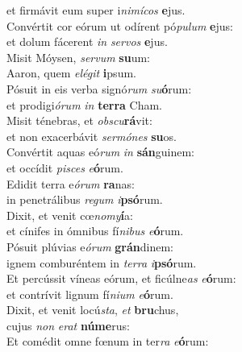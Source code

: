 \oddverse et firmávit eum super i\textit{ni}\textit{mí}\textit{cos} \textbf{e}jus.\\
\evenverse Convértit cor eórum ut odírent pó\textit{pu}\textit{lum} \textbf{e}jus:~\*\\
\evenverse et dolum fácerent \textit{in} \textit{ser}\textit{vos} \textbf{e}jus.\\
\oddverse Misit Móysen, \textit{ser}\textit{vum} \textbf{su}um:~\*\\
\oddverse Aaron, quem \textit{e}\textit{lé}\textit{git} \textbf{i}psum.\\
\evenverse Pósuit in eis verba signó\textit{rum} \textit{su}\textbf{ó}rum:~\*\\
\evenverse et prodigi\textit{ó}\textit{rum} \textit{in} \textbf{ter}\textbf{ra} Cham.\\
\oddverse Misit ténebras, et \textit{ob}\textit{scu}\textbf{rá}vit:~\*\\
\oddverse et non exacerbávit \textit{ser}\textit{mó}\textit{nes} \textbf{su}os.\\
\evenverse Convértit aquas eó\textit{rum} \textit{in} \textbf{sán}guinem:~\*\\
\evenverse et occídit \textit{pi}\textit{sces} \textit{e}\textbf{ó}rum.\\
\oddverse Edidit terra e\textit{ó}\textit{rum} \textbf{ra}nas:~\*\\
\oddverse in penetrálibus \textit{re}\textit{gum} \textit{i}\textbf{psó}rum.\\
\evenverse Dixit, et venit cœ\textit{no}\textit{my}\textbf{í}a:~\*\\
\evenverse et cínifes in ómnibus fí\textit{ni}\textit{bus} \textit{e}\textbf{ó}rum.\\
\oddverse Pósuit plúvias e\textit{ó}\textit{rum} \textbf{grán}dinem:~\*\\
\oddverse ignem comburéntem in \textit{ter}\textit{ra} \textit{i}\textbf{psó}rum.\\
\evenverse Et percússit víneas eórum, et ficúlne\textit{as} \textit{e}\textbf{ó}rum:~\*\\
\evenverse et contrívit lignum fí\textit{ni}\textit{um} \textit{e}\textbf{ó}rum.\\
\oddverse Dixit, et venit locú\textit{sta}, \textit{et} \textbf{bru}chus,~\*\\
\oddverse cujus \textit{non} \textit{e}\textit{rat} \textbf{nú}\textbf{me}rus:\\
\evenverse Et comédit omne fœnum in ter\textit{ra} \textit{e}\textbf{ó}rum:~\*\\
